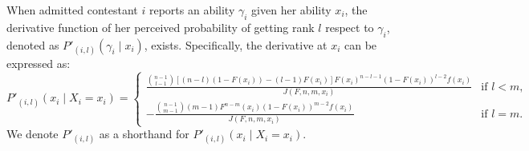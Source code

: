 \begin{corollary}\label{coro:DerivProb}
When admitted contestant $i$ reports an ability $\gamma_i$ given her ability $x_i$, the derivative function of her perceived probability of getting rank $l$ respect to $\gamma_i$, denoted as $P'_{(i,l)}(\gamma_i \mid x_i)$, exists. Specifically, the derivative at $x_i$ can be expressed as: 
\[
P'_{(i,l)}(x_i\mid X_i=x_i) =   
\begin{cases} 
\frac{\binom{n-1}{l-1}\left [ (n-l)(1-F(x_i))-(l-1)F(x_i)\right ]F(x_i)^{n-l-1}(1-F(x_i))^{l-2}f(x_i)}{J(F,n,m,x_i)} & \text{if } l < m, \\
- \frac{\binom{n-1}{m-1}(m-1)F^{n-m}(x_i)(1-F(x_i))^{m-2}f(x_i)}{J(F,n,m,x_i)} & \text{if } l = m.
\end{cases}
\]
We denote $P'_{(i,l)}$ as a shorthand for $P'_{(i,l)}(x_i\mid X_i=x_i)$. 
\end{corollary}
